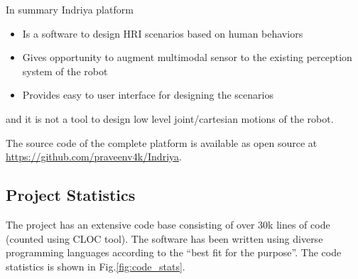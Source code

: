 In summary Indriya platform
\begin{itemize}
\item Is a software to design HRI scenarios based on human behaviors
\item Gives opportunity to augment multimodal sensor to the existing perception system of the robot
\item Provides easy to user interface for designing the scenarios
\end{itemize}
and it is not a tool to design low level joint/cartesian motions of the robot.
	
The source code of the complete platform is available as open source at \url{https://github.com/praveenv4k/Indriya}. 
\subsection{Project Statistics}
The project has an extensive code base consisting of over 30k lines of code (counted using CLOC \cite{cloc} tool). The software has been written using diverse programming languages according to the ``best fit for the purpose''. The code statistics is shown in Fig.\ref{fig:code_stats}.

